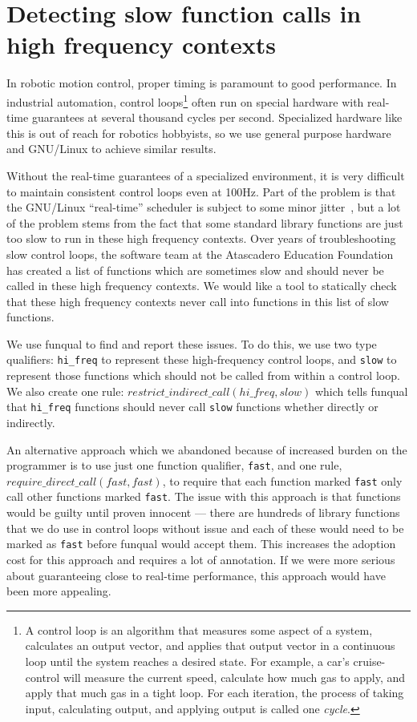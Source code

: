 \section{Detecting slow function calls in high frequency contexts}\label{sec:app:blocking}

In robotic motion control, proper timing is paramount to good performance.  In industrial automation, control loops\footnote{A control loop is an algorithm that measures some aspect of a system, calculates an output vector, and applies that output vector in a continuous loop until the system reaches a desired state.  For example, a car's cruise-control will measure the current speed, calculate how much gas to apply, and apply that much gas in a tight loop.  For each iteration, the process of taking input, calculating output, and applying output is called one \textit{cycle}.} often run on special hardware with real-time guarantees at several thousand cycles per second.  Specialized hardware like this is out of reach for robotics hobbyists, so we use general purpose hardware and GNU/Linux to achieve similar results. 

Without the real-time guarantees of a specialized environment, it is very difficult to maintain consistent control loops even at 100Hz.  Part of the problem is that the GNU/Linux ``real-time'' scheduler is subject to some minor jitter~\cite{rt-jitter}, but a lot of the problem stems from the fact that some standard library functions are just too slow to run in these high frequency contexts.  Over years of troubleshooting slow control loops, the software team at the Atascadero Education Foundation has created a list of functions which are sometimes slow and should never be called in these high frequency contexts.  We would like a tool to statically check that these high frequency contexts never call into functions in this list of slow functions.  

We use funqual to find and report these issues.  To do this, we use two type qualifiers: \lstinline{hi_freq} to represent these high-frequency control loops, and \lstinline{slow} to represent those functions which should not be called from within a control loop.  We also create one rule: $restrict\_indirect\_call(hi\_freq, slow)$ which tells funqual that \lstinline{hi_freq} functions should never call \lstinline{slow} functions whether directly or indirectly. 

An alternative approach which we abandoned because of increased burden on the programmer is to use just one function qualifier, \lstinline{fast}, and one rule, $require\_direct\_call(\allowbreak fast, fast)$, to require that each function marked \lstinline{fast} only call other functions marked \lstinline{fast}.  The issue with this approach is that  functions would be guilty until proven innocent --- there are hundreds of library functions that we do use in control loops without issue and each of these would need to be marked as \lstinline{fast} before funqual would accept them.  This increases the adoption cost for this approach and requires a lot of annotation. If we were more serious about guaranteeing close to real-time performance, this approach would have been more appealing.  

